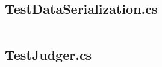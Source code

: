 \documentclass[a4paper]{report}
\begin{document}
\inputminted{csharp}{"../src/Algorithm Dynamics.Test/TestDataAccess.cs"}

\subsection{TestDataSerialization.cs}

\inputminted{csharp}{"../src/Algorithm Dynamics.Test/TestDataSerialization.cs"}

\subsection{TestJudger.cs}

\inputminted{csharp}{"../src/Algorithm Dynamics.Test/TestJudger.cs"}

\setcounter{biburlnumpenalty}{9000}
\setcounter{biburllcpenalty}{9000}
\setcounter{biburlucpenalty}{9000}

\printbibliography[
    heading=bibintoc,
    title={Bibliography}
]
\end{document}
